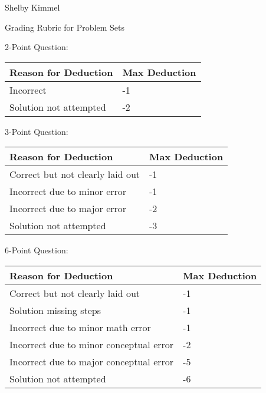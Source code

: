 \documentclass[12pt,landscape]{article}
\begin{document}
\hfill Shelby Kimmel

\begin{center}
{\huge Grading Rubric for Problem Sets}
\end{center}
\bigskip
\begin{multicols}{2}


{\large 2-Point Question:}


{\renewcommand{\arraystretch}{2}
\begin{tabular}{|p{6cm}|p{3.5cm}|}
\hline
{\bf Reason for Deduction}& {\bf Max Deduction}\\
\hline
  Incorrect &-1 \\ 
  Solution not attempted &-2 \\
  \hline
\end{tabular}}

\bigskip\bigskip
{\large 3-Point Question:}


{\renewcommand{\arraystretch}{2}
\begin{tabular}{|p{6cm}|p{3.5cm}|}
\hline
{\bf Reason for Deduction}& {\bf Max Deduction}\\
\hline
  Correct but not clearly laid out &-1 \\  
  Incorrect due to minor error &-1 \\  
  Incorrect due to major error &-2 \\  
  Solution not attempted &-3 \\
  \hline
\end{tabular}}

\vfill

{\large 6-Point Question:}


{\renewcommand{\arraystretch}{2}
\begin{tabular}{|p{6cm}|p{3.5cm}|}
\hline
{\bf Reason for Deduction}& {\bf Max Deduction}\\
\hline
  Correct but not clearly laid out &-1 \\ 
  Solution missing steps &-1 \\  
  Incorrect due to minor math error &-1 \\  
  Incorrect due to minor conceptual error &-2 \\  
  Incorrect due to major conceptual error &-5 \\  
  Solution not attempted &-6 \\
  \hline
\end{tabular}}


\end{multicols}

\newpage
\end{document}

